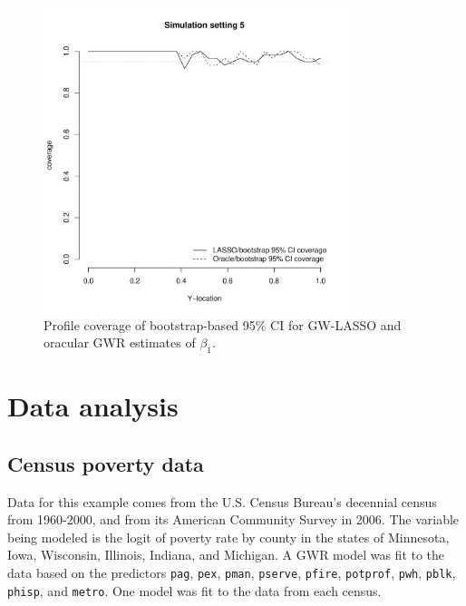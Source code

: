 \documentclass[authoryear, review, 11pt]{elsarticle}
\begin{document}
	\begin{figure}
		\begin{center}
			\includegraphics[height=3.5in]{../../figures/simulation/28-5-profile-coverage.pdf}
			\caption{Profile coverage of bootstrap-based 95\% CI for GW-LASSO and oracular GWR estimates of $\beta_1$.\label{fig:simulation-5-coverage}}
		\end{center}
	\end{figure}
	
	
		
\section{Data analysis}
	\subsection{Census poverty data}
	Data for this example comes from the U.S. Census Bureau's decennial census from 1960-2000, and from its American Community Survey in 2006. The variable being modeled is the logit of poverty rate by county in the states of Minnesota, Iowa, Wisconsin, Illinois, Indiana, and Michigan. A GWR model was fit to the data based on the predictors \verb!pag!, \verb!pex!, \verb!pman!, \verb!pserve!, \verb!pfire!, \verb!potprof!, \verb!pwh!, \verb!pblk!, \verb!phisp!, and \verb!metro!. One model was fit to the data from each census.
	
\end{document}
